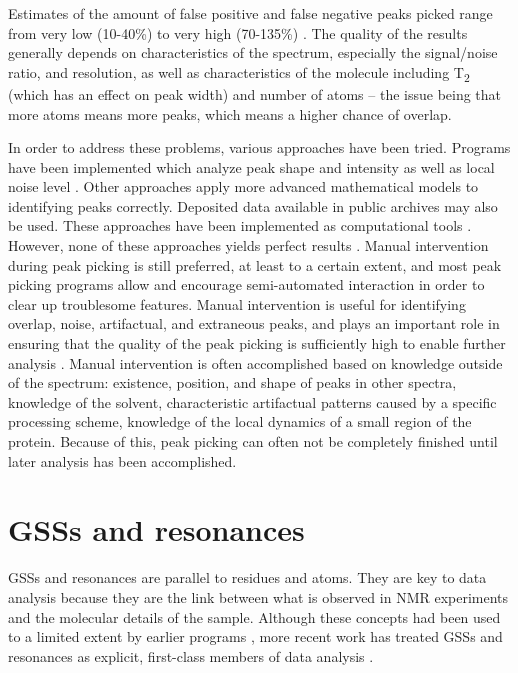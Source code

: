 Estimates of the amount of false positive and false negative peaks picked 
range from very low (10-40\%) to very high (70-135\%) \cite{pine}. 
The quality of the results generally depends on characteristics of the 
spectrum, especially the signal/noise ratio, and resolution, as well as 
characteristics of the molecule including T\textsubscript{2} (which has an effect on peak 
width) and number of atoms -- the issue being that more atoms means more 
peaks, which means a higher chance of overlap.

In order to address these problems, various approaches have been tried.  
Programs have been implemented which analyze peak shape and intensity as 
well as local noise level \cite{munin, autopsy}.  Other approaches 
apply more advanced mathematical models to identifying peaks correctly.  
Deposited data available in public archives may also be used. 
These approaches have been implemented as computational tools 
\cite{williamson2009automated, guerry2011automated}.
However, none of these approaches yields perfect 
results \cite{guerry2011automated}.  Manual intervention during peak picking 
is still preferred, at least to a certain extent, and most peak picking 
programs allow and encourage semi-automated interaction in order to clear 
up troublesome features.  Manual intervention is useful for identifying 
overlap, noise, artifactual, and extraneous peaks, 
and plays an important role in ensuring that the quality of the peak picking 
is sufficiently high to enable further analysis \cite{guntert2009automated}.  
Manual intervention is often accomplished based on knowledge outside of the 
spectrum: existence, position, and shape of peaks in other spectra, knowledge 
of the solvent, characteristic artifactual patterns caused by a specific 
processing scheme, knowledge of the local dynamics of a small region of the 
protein.  \cite{williamson2009automated, guntert2009automated, 
altieri2004automation, baran2004automated}
Because of this, peak picking can often not be completely finished until 
later analysis has been accomplished.


\section{GSSs and resonances}

GSSs \cite{saga, ezassign, pistachio, autoassign1997, autoassign2001}
and resonances \cite{ccpn} are parallel to residues and atoms.
They are key to data analysis because they are the link between what is 
observed in NMR experiments and the molecular details of the sample.
Although these concepts had been used to a limited extent by earlier programs
\cite{xeasy, sparky}, more recent work has treated GSSs and resonances as 
explicit, first-class members of data analysis \cite{ccpn, bmrb}.

